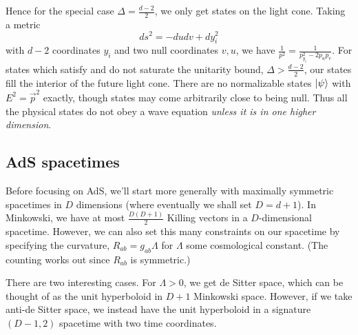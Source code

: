 Hence for the special case $\Delta =\frac{d-2}{2}$, we only get states on the light cone. Taking a metric
\begin{equation}
    ds^2 = -dudv + dy_i^2
\end{equation}
with $d-2$ coordinates $y_i$ and two null coordinates $v,u$, we have $\frac{1}{p^2} =\frac{1}{p_{y_i}^2 -2p_u p_v}$. For states which satisfy and do not saturate the unitarity bound, $\Delta > \frac{d-2}{2}$, our states fill the interior of the future light cone. There are no normalizable states $\lvert\psi\rangle$ with $E^2=\vec p^2$ exactly, though states may come arbitrarily close to being null. Thus all the physical states do not obey a wave equation \emph{unless it is in one higher dimension}.

\subsection*{AdS spacetimes}
Before focusing on AdS, we'll start more generally with maximally symmetric spacetimes in $D$ dimensions (where eventually we shall set $D=d+1$). In Minkowski, we have at most $\frac{D(D+1)}{2}$ Killing vectors in a $D$-dimensional spacetime. However, we can also set this many constraints on our spacetime by specifying the curvature, $R_{ab} = g_{ab}\Lambda$ for $\Lambda$ some cosmological constant. (The counting works out since $R_{ab}$ is symmetric.)

There are two interesting cases. For $\Lambda >0$, we get de Sitter space, which can be thought of as the unit hyperboloid in $D+1$ Minkowski space. However, if we take anti-de Sitter space, we instead have the unit hyperboloid in a signature $(D-1,2)$ spacetime with two time coordinates.